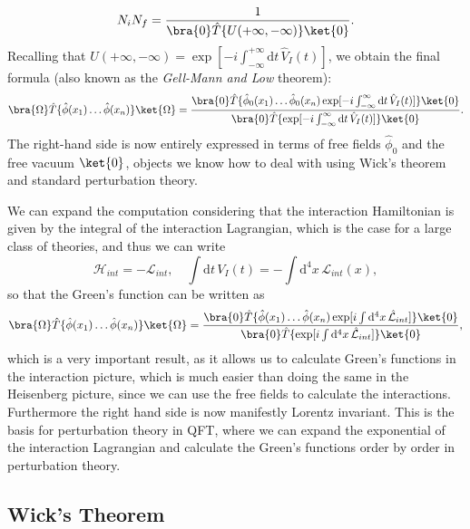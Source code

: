\[
    N_i N_f = \frac{1}{\bra{0} \hat{T} \{ U(+\infty, -\infty) \} \ket{0}}.
\]
Recalling that \(U(+\infty, -\infty) = \exp\left[ -i \int_{-\infty}^{+\infty} \mathrm{d}t \, \hat{V}_I(t) \right]\), we obtain the final formula (also known as the \textit{Gell-Mann and Low} theorem):
\[
    \bra{\Omega} \hat{T} \{ \hat{\phi} (x_1) \dots \hat{\phi} (x_n) \} \ket{\Omega} = \frac{\bra{0} \hat{T} \{ \hat{\phi}_0 (x_1) \dots \hat{\phi}_0(x_n) \exp[ -i \int_{-\infty}^{\infty} \mathrm{d} t \, \hat{V}_I(t) ] \}\ket{0}}{\bra{0} \hat{T} \{ \exp[ -i \int_{-\infty}^{\infty} \mathrm{d} t \, \hat{V}_I(t) ] \} \ket{0}}.
\]
The right-hand side is now entirely expressed in terms of free fields \(\hat{\phi}_0\) and the free vacuum \(\ket{0}\), objects we know how to deal with using Wick's theorem and standard perturbation theory.

We can expand the computation considering that the interaction Hamiltonian is given by the integral of the interaction Lagrangian, which is the case for a large class of theories, and thus we can write
\[
    \mathcal{H}_{int} = -\mathcal{L}_{int}, \quad \int \mathrm{d} t \, V_I(t) = - \int \mathrm{d}^4 x \, \mathcal{L}_{int} (x),
\]
so that the Green's function can be written as
\[
    \bra{\Omega} \hat{T} \{ \hat{\phi} (x_1) \dots \hat{\phi} (x_n) \} \ket{\Omega} = \frac{\bra{0} \hat{T} \{ \hat{\phi} (x_1) \dots \hat{\phi}(x_n) \exp[ i \int \mathrm{d}^4 x \, \hat{\mathcal{L}}_{int} ] \} \ket{0}}{\bra{0} \hat{T} \{ \exp[ i \int \mathrm{d}^4 x \, \hat{\mathcal{L}}_{int} ] \} \ket{0}},
\]
which is a very important result, as it allows us to calculate Green's functions in the interaction picture, which is much easier than doing the same in the Heisenberg picture, since we can use the free fields to calculate the interactions. Furthermore the right hand side is now manifestly Lorentz invariant. This is the basis for perturbation theory in QFT, where we can expand the exponential of the interaction Lagrangian and calculate the Green's functions order by order in perturbation theory.

\subsection{Wick's Theorem}

